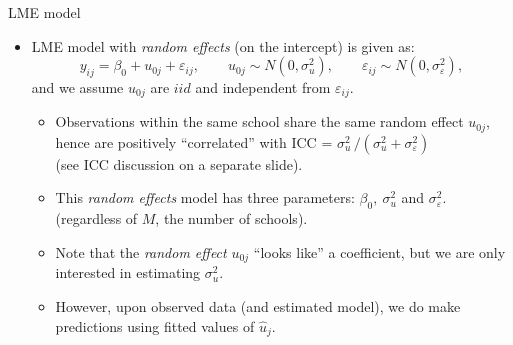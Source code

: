 \documentclass{beamer}
\begin{document}
\begin{frame}{LME model}
\begin{itemize}
\item LME model with \textit{random effects} (on the intercept) is given as:
$$ y_{ij} = \beta_{0} + u_{0j} + \varepsilon_{ij}, \qquad u_{0j} \sim N(0,\sigma^2_u), \qquad \varepsilon_{ij} \sim N(0,\sigma^2_{\varepsilon}), $$
and we assume $u_{0j}$ are $iid$ and independent from $\varepsilon_{ij}$.\\
\smallskip
\begin{itemize}
\item Observations within the same school share the same random effect $u_{0j}$, hence are positively ``correlated'' with \textnormal{ICC} = $\sigma^2_u \, / (\sigma^2_u + \sigma^2_{\varepsilon})$ \\ (see ICC discussion on a separate slide).
\medskip
\item This \textit{random effects} model has three parameters: $\beta_{0},~ \sigma^2_u$ and $\sigma^2_{\varepsilon}$. (regardless of $M$, the number of schools).
\medskip
\item Note that the \textit{random effect} $u_{0j}$ ``looks like'' a coefficient, but we are only interested in estimating $\sigma^2_u$.
\medskip
\item However, upon observed data (and estimated model), we do make predictions using fitted values of $\hat{u}_j$.
\end{itemize}
\end{itemize}
\end{frame}
\end{document}
